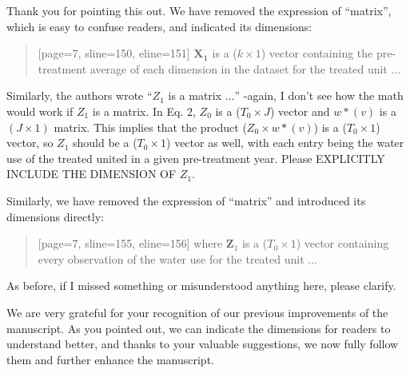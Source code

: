 \AR{} Thank you for pointing this out. We have removed the expression of ``matrix'', which is easy to confuse readers, and indicated its dimensions:

\begin{quote}[page=7, sline=150, eline=151]
    $\mathbf{X_1}$ is a ($k \times 1$) vector containing the pre-treatment average of each dimension in the dataset for the treated unit $\dots$
\end{quote}

\RC{} Similarly, the authors wrote ``$Z_1$ is a matrix $\dots$'' -again, I don't see how the math would work if $Z_1$ is a matrix. In Eq. 2, $Z_0$ is a ($T_0 \times J$) vector and $w*(v)$ is a $(J \times 1)$ matrix. This implies that the product ($Z_0 \times w*(v)$) is a ($T_0 \times 1$) vector, so $Z_1$ should be a ($T_0 \times 1$) vector as well, with each entry being the water use of the treated united in a given pre-treatment year. Please EXPLICITLY INCLUDE THE DIMENSION OF $Z_1$.

\AR{} Similarly, we have removed the expression of ``matrix'' and introduced its dimensions directly:

\begin{quote}[page=7, sline=155, eline=156]
    where $\mathbf{Z}_{1}$ is a ($T_0 \times 1$) vector containing every observation of the water use for the treated unit $\dots$
\end{quote}

As before, if I missed something or misunderstood anything here, please clarify.

\AR{} We are very grateful for your recognition of our previous improvements of the manuscript. As you pointed out, we can indicate the dimensions for readers to understand better, and thanks to your valuable suggestions, we now fully follow them and further enhance the manuscript.

